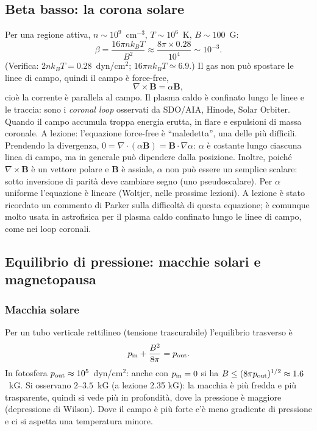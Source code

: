 \subsection{Beta basso: la corona solare}
Per una regione attiva, $n\sim10^9$~cm$^{-3}$, $T\sim10^6$~K, $B\sim100$~G:
\begin{equation}
\beta=\frac{16\pi nk_BT}{B^2}\approx\frac{8\pi\times0.28}{10^4}\sim10^{-3}.
\end{equation}
(Verifica: $2nk_BT=0.28$~dyn/cm$^2$; $16\pi nk_BT\simeq6.9$.) Il gas non può spostare le linee di campo, quindi il campo è force-free,
\begin{equation}
\nabla\times\mathbf{B}=\alpha\mathbf{B},
\end{equation}
cioè la corrente è parallela al campo. Il plasma caldo è confinato lungo le linee e le traccia: sono i \emph{coronal loop} osservati da SDO/AIA, Hinode, Solar Orbiter. Quando il campo accumula troppa energia erutta, in flare e espulsioni di massa coronale.
A lezione: l'equazione force-free è ``maledetta'', una delle più difficili. Prendendo la divergenza, $0=\nabla\cdot(\alpha\mathbf{B})=\mathbf{B}\cdot\nabla\alpha$: $\alpha$ è costante lungo ciascuna linea di campo, ma in generale può dipendere dalla posizione. Inoltre, poiché $\nabla\times\mathbf{B}$ è un vettore polare e $\mathbf{B}$ è assiale, $\alpha$ non può essere un semplice scalare: sotto inversione di parità deve cambiare segno (uno pseudoscalare). Per $\alpha$ uniforme l'equazione è lineare (Woltjer, nelle prossime lezioni). A lezione è stato ricordato un commento di Parker sulla difficoltà di questa equazione; è comunque molto usata in astrofisica per il plasma caldo confinato lungo le linee di campo, come nei loop coronali.

\subsection{Equilibrio di pressione: macchie solari e magnetopausa}
\subsubsection*{Macchia solare}
Per un tubo verticale rettilineo (tensione trascurabile) l'equilibrio trasverso è
\begin{equation}
p_{\rm in}+\frac{B^2}{8\pi}=p_{\rm out}.
\end{equation}
In fotosfera $p_{\rm out}\approx10^5$~dyn/cm$^2$: anche con $p_{\rm in}=0$ si ha $B\le(8\pi p_{\rm out})^{1/2}\approx1.6$~kG. Si osservano $2$--$3.5$~kG (a lezione 2.35 kG): la macchia è più fredda e più trasparente, quindi si vede più in profondità, dove la pressione è maggiore (depressione di Wilson). Dove il campo è più forte c'è meno gradiente di pressione e ci si aspetta una temperatura minore.
